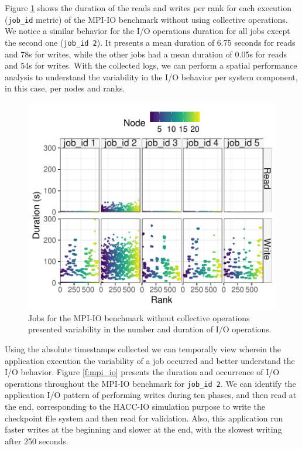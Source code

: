Figure \ref{f:mpi_io_all} shows the duration of the reads and writes
per rank for each execution (\texttt{job\_id} metric) of the MPI-IO
benchmark without using collective operations. We notice a similar
behavior for the I/O operations duration for all jobs except the
second one (\texttt{job\_id 2}). It presents a mean duration of 6.75
seconds for reads and 78s for writes, while the other jobs had a mean
duration of 0.05s for reads and 54s for writes. With the collected
logs, we can perform a spatial performance analysis to understand the
variability in the I/O behavior per system component, in this case,
per nodes and ranks.
      
\begin{figure}
	\centering
        \includegraphics[width=\linewidth]{figs/mpi_io_luster_no_coll_duration_allexperiments.pdf}
	\caption{Jobs for the MPI-IO benchmark without collective
          operations presented variability in the number and duration
          of I/O operations.}
	\label{f:mpi_io_all}
\end{figure}

Using the absolute timestamps collected we can temporally view
wherein the application execution the variability of a job
occurred and better understand the I/O behavior. Figure \ref{f:mpi_io} presents the duration and occurrence of
I/O operations throughout the MPI-IO benchmark for \texttt{job\_id
  2}. We can identify the application I/O pattern of performing
writes during ten phases, and then read at the end, corresponding to the HACC-IO simulation purpose to write the checkpoint file system and then read for validation. Also, this
application run faster writes at the beginning and slower at the end,
with the slowest writing after 250 seconds.
      
